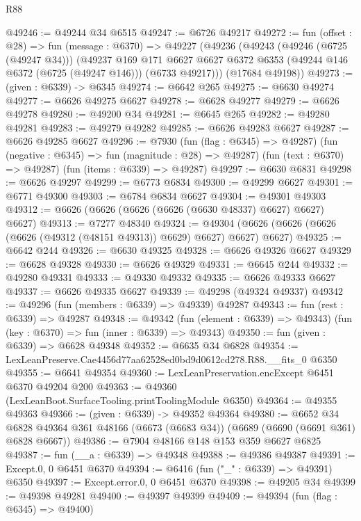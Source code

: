 \begin{lexlean}{R88}
\begin{coremodule}
@49246 := @49244 @34 @6515
@49247 := @6726 @49217
@49272 := fun (offset : @28) =>
  fun (message : @6370) =>
  @49227
    (@49236
      (@49243
        (@49246 (@6725 (@49247 @34)))
        (@49237
          @169
          @171
          @6627
          @6627
          @6372
          @6353
          (@49244 @146 @6372 (@6725 (@49247 @146)))
          (@6733 @49217)))
      (@17684 @49198))
@49273 := (given : @6339) -> @6345
@49274 := @6642 @265
@49275 := @6630 @49274
@49277 := @6626 @49275 @6627
@49278 := @6628 @49277
@49279 := @6626 @49278
@49280 := @49200 @34
@49281 := @6645 @265
@49282 := @49280 @49281
@49283 := @49279 @49282
@49285 := @6626 @49283 @6627
@49287 := @6626 @49285 @6627
@49296 := @7930
    (fun (flag : @6345) => @49287)
    (fun (negative : @6345) => fun (magnitude : @28) => @49287)
    (fun (text : @6370) => @49287)
    (fun (items : @6339) => @49287)
@49297 := @6630 @6831
@49298 := @6626 @49297
@49299 := @6773 @6834
@49300 := @49299 @6627
@49301 := @6771 @49300
@49303 := @6784 @6834 @6627
@49304 := @49301 @49303
@49312 := @6626 (@6626 (@6626 (@6626 (@6630 @48337) @6627) @6627) @6627)
@49313 := @7277 @48340
@49324 := @49304 (@6626 (@6626 (@6626 (@6626 (@49312 (@48151 @49313)) @6629) @6627) @6627) @6627)
@49325 := @6642 @244
@49326 := @6630 @49325
@49328 := @6626 @49326 @6627
@49329 := @6628 @49328
@49330 := @6626 @49329
@49331 := @6645 @244
@49332 := @49280 @49331
@49333 := @49330 @49332
@49335 := @6626 @49333 @6627
@49337 := @6626 @49335 @6627
@49339 := @49298 (@49324 @49337)
@49342 := @49296 (fun (members : @6339) => @49339) @49287
@49343 := fun (rest : @6339) => @49287
@49348 := @49342
    (fun (element : @6339) => @49343)
    (fun (key : @6370) => fun (inner : @6339) => @49343)
@49350 := fun (given : @6339) => @6628 @49348
@49352 := @6635 @34 @6828
@49354 := LexLeanPreserve.Cae4456d77aa62528ed0bd9d0612cd278.R88.__fits_0 @6350
@49355 := @6641 @49354
@49360 := LexLeanPreservation.encExcept @6451 @6370 @49204 @200
@49363 := @49360 (LexLeanBoot.SurfaceTooling.printToolingModule @6350)
@49364 := @49355 @49363
@49366 := (given : @6339) -> @49352 @49364
@49380 := @6652
    @34
    @6828
    @49364
    @361
    @48166
    (@6673 (@6683 @34))
    (@6689 (@6690 (@6691 @361) @6828 @6667))
@49386 := @7904 @48166 @148 @153 @359 @6627 @6825
@49387 := fun (__a : @6339) => @49348
@49388 := @49386 @49387
@49391 := Except.{0, 0} @6451 @6370
@49394 := @6416 (fun ("_" : @6339) => @49391) @6350
@49397 := Except.error.{0, 0} @6451 @6370
@49398 := @49205 @34
@49399 := @49398 @49281
@49400 := @49397 @49399
@49409 := @49394
    (fun (flag : @6345) => @49400)

\end{coremodule}
\end{lexlean}
